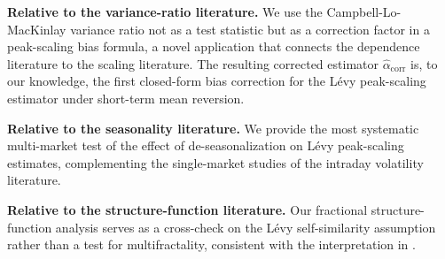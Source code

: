 \documentclass[12pt,a4paper]{article}
\begin{document}
\textbf{Relative to the variance-ratio literature.} We use the
Campbell-Lo-MacKinlay variance ratio not as a test statistic but as a
correction factor in a peak-scaling bias formula, a novel application that
connects the dependence literature to the scaling literature. The resulting
corrected estimator $\hat\alpha_{\mathrm{corr}}$ is, to our knowledge, the
first closed-form bias correction for the Lévy peak-scaling estimator under
short-term mean reversion.

\textbf{Relative to the seasonality literature.} We provide the most
systematic multi-market test of the effect of de-seasonalization on Lévy
peak-scaling estimates, complementing the single-market studies of the
intraday volatility literature.

\textbf{Relative to the structure-function literature.} Our fractional
structure-function analysis serves as a cross-check on the Lévy
self-similarity assumption rather than a test for multifractality, consistent
with the interpretation in \textcite{BouchaudPotters2003}.


\printbibliography[heading=bibintoc,title={References}]
\end{document}
